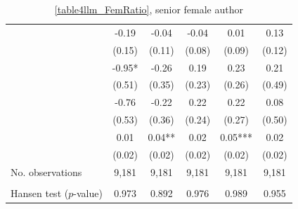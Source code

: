 \begin{table}
    \footnotesize
    \centering
    \begin{threeparttable}
        \caption{\autoref{table4llm_FemRatio}, senior female author}
        \label{table4llm_FemSenior}
        \begin{tabular}{p{3cm}S@{}S@{}S@{}S@{}S@{}}
            \toprule
            &{}&{}&{}&{}&{}\\
            \midrule
            &       -0.19   &       -0.04   &       -0.04   &        0.01   &        0.13   \\
                                          &      (0.15)   &      (0.11)   &      (0.08)   &      (0.09)   &      (0.12)   \\
            &       -0.95*  &       -0.26   &        0.19   &        0.23   &        0.21   \\
                                          &      (0.51)   &      (0.35)   &      (0.23)   &      (0.26)   &      (0.49)   \\
            &       -0.76   &       -0.22   &        0.22   &        0.22   &        0.08   \\
                                          &      (0.53)   &      (0.36)   &      (0.24)   &      (0.27)   &      (0.50)   \\
            &        0.01   &        0.04** &        0.02   &        0.05***&        0.02   \\
                                          &      (0.02)   &      (0.02)   &      (0.02)   &      (0.02)   &      (0.02)   \\
            \midrule
            No. observations      &       9,181   &       9,181   &       9,181   &       9,181   &       9,181   \\
             \\\quad Hansen test (\(p\)-value)&       0.973   &       0.892   &       0.976   &       0.989   &       0.955   \\

\end{tabular}
\end{threeparttable}
\end{table}
